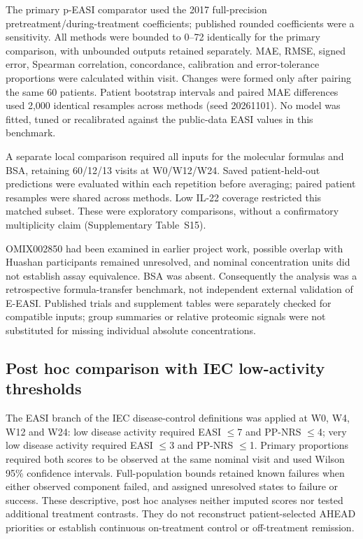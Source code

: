 \documentclass[10pt,a4paper]{article}
\begin{document}
The primary p-EASI comparator used the 2017 full-precision pretreatment/during-treatment coefficients; published rounded coefficients were a sensitivity. All methods were bounded to 0--72 identically for the primary comparison, with unbounded outputs retained separately. MAE, RMSE, signed error, Spearman correlation, concordance, calibration and error-tolerance proportions were calculated within visit. Changes were formed only after pairing the same 60 patients. Patient bootstrap intervals and paired MAE differences used 2,000 identical resamples across methods (seed 20261101). No model was fitted, tuned or recalibrated against the public-data EASI values in this benchmark.

A separate local comparison required all inputs for the molecular formulas and BSA, retaining 60/12/13 visits at W0/W12/W24. Saved patient-held-out predictions were evaluated within each repetition before averaging; paired patient resamples were shared across methods. Low IL-22 coverage restricted this matched subset. These were exploratory comparisons, without a confirmatory multiplicity claim (Supplementary Table~S15).

OMIX002850 had been examined in earlier project work, possible overlap with Huashan participants remained unresolved, and nominal concentration units did not establish assay equivalence. BSA was absent. Consequently the analysis was a retrospective formula-transfer benchmark, not independent external validation of E-EASI. Published trials and supplement tables were separately checked for compatible inputs; group summaries or relative proteomic signals were not substituted for missing individual absolute concentrations.

\subsection{Post hoc comparison with IEC low-activity thresholds}
The EASI branch of the IEC disease-control definitions was applied at W0, W4, W12 and W24: low disease activity required EASI $\leq$7 and PP-NRS $\leq$4; very low disease activity required EASI $\leq$3 and PP-NRS $\leq$1.\citep{merola2026iec} Primary proportions required both scores to be observed at the same nominal visit and used Wilson 95\% confidence intervals. Full-population bounds retained known failures when either observed component failed, and assigned unresolved states to failure or success. These descriptive, post hoc analyses neither imputed scores nor tested additional treatment contrasts. They do not reconstruct patient-selected AHEAD priorities or establish continuous on-treatment control or off-treatment remission.
\end{document}
